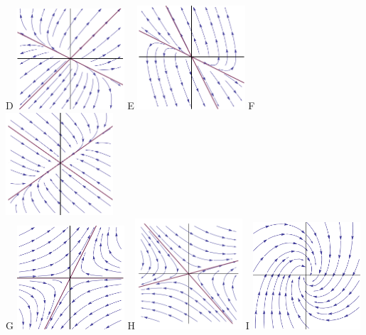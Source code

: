 \documentclass[epsf]{article}
\begin{document}
\begin{center}
\vskip 1cm
D \includegraphics[width=40mm]{source1.png}\hspace{0.6 cm} E \includegraphics[width=40mm]{source2.png}\hspace{0.6 cm} F \includegraphics[width=40mm]{sink.png}\\
\vskip 1cm
G \includegraphics[width=40mm]{saddle.png}\hspace{0.6 cm} H\includegraphics[width=40mm]{saddle2.png}\hspace{0.6 cm} I \includegraphics[width=40mm]{stable_spiral.png}\\

\end{center}
\end{document}
